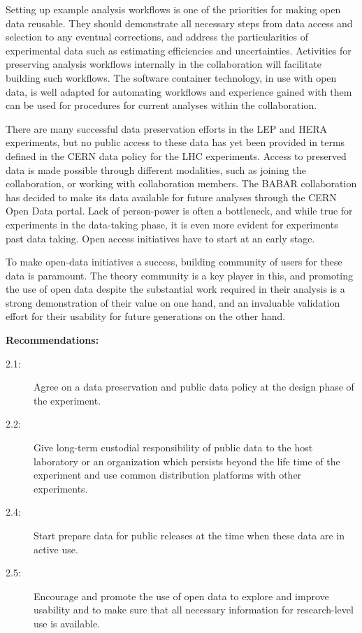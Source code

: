 \documentclass[11pt]{article}
\begin{document}
Setting up example analysis workflows is one of the priorities for making open data reusable. They should demonstrate all necessary steps from data access and selection to any eventual corrections, and address the particularities of experimental data such as estimating efficiencies and uncertainties. Activities for preserving analysis workflows internally in the collaboration will facilitate building such workflows. The software container technology, in use with open data, is well adapted for automating workflows and experience gained with them can be used for procedures for current analyses within the collaboration.


There are many successful data preservation efforts in the LEP and HERA experiments, but no public access to these data has yet been provided in terms defined in the CERN data policy for the LHC experiments. Access to preserved data is made possible through different modalities, such as joining the collaboration, or working with collaboration members. The BABAR collaboration has decided to make its data available for future analyses through the CERN Open Data portal. Lack of person-power is often a bottleneck, and while true for experiments in the data-taking phase, it is even more evident for experiments past data taking. Open access initiatives have to start at an early stage.


To make open-data initiatives a success, building community of users for these data is paramount. The theory community is a key player in this, and promoting the use of open data despite the substantial work required in their analysis is a strong demonstration of their value on one hand, and an invaluable validation effort for their usability for future generations on the other hand.

\noindent
\textbf{Recommendations:}
\begin{description}
   \item[2.1:] Agree on a data preservation and public data policy at the design phase of the experiment.
   \item[2.2:] Give long-term custodial responsibility of public data to the host laboratory or an organization which persists beyond the life time of the experiment and use common distribution platforms with other experiments.
   \item[2.4:] Start prepare data for public releases at the time when these data are in active use.
   \item[2.5:] Encourage and promote the use of open data to explore and improve usability and to make sure that all necessary information for research-level use is available.
\end{description}
\end{document}
